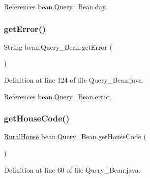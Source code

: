 References bean.\+Query\+\_\+\+Bean.\+day.

\mbox{\label{classbean_1_1Query__Bean_a008055cfab609b48b5c3e74ddc26303c}} 
\subsubsection{\texorpdfstring{getError()}{getError()}}
{\footnotesize\ttfamily String bean.\+Query\+\_\+\+Bean.\+get\+Error (\begin{DoxyParamCaption}{ }\end{DoxyParamCaption})}



Definition at line 124 of file Query\+\_\+\+Bean.\+java.


\begin{DoxyCode}{0}

\end{DoxyCode}


References bean.\+Query\+\_\+\+Bean.\+error.

\mbox{\label{classbean_1_1Query__Bean_a82506db8f6c6211fb6ad55310c63d0b6}} 
\subsubsection{\texorpdfstring{getHouseCode()}{getHouseCode()}}
{\footnotesize\ttfamily \mbox{\hyperlink{classdomain_1_1RuralHouse}{Rural\+House}} bean.\+Query\+\_\+\+Bean.\+get\+House\+Code (\begin{DoxyParamCaption}{ }\end{DoxyParamCaption})}



Definition at line 60 of file Query\+\_\+\+Bean.\+java.


\begin{DoxyCode}{0}

\end{DoxyCode}


